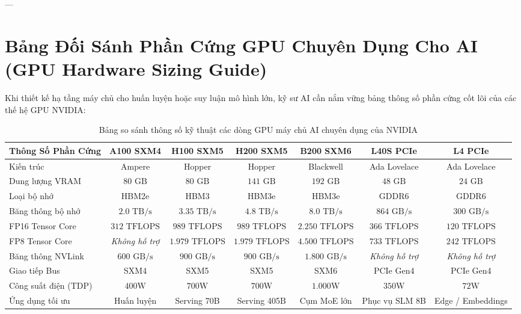 ---

\section{Bảng Đối Sánh Phần Cứng GPU Chuyên Dụng Cho AI (GPU Hardware Sizing Guide)}
\label{sec:app-cheat-gpu-hardware}

Khi thiết kế hạ tầng máy chủ cho huấn luyện hoặc suy luận mô hình lớn, kỹ sư AI cần nắm vững bảng thông số phần cứng cốt lõi của các thế hệ GPU NVIDIA:

\begin{table}[htbp]
\centering
\scriptsize
\caption{Bảng so sánh thông số kỹ thuật các dòng GPU máy chủ AI chuyên dụng của NVIDIA}
\label{tab:app-gpu-specs-comparison}
\begin{tabular}{lcccccc}
\toprule
\textbf{Thông Số Phần Cứng} & \textbf{A100 SXM4} & \textbf{H100 SXM5} & \textbf{H200 SXM5} & \textbf{B200 SXM6} & \textbf{L40S PCIe} & \textbf{L4 PCIe} \\
\midrule
Kiến trúc & Ampere & Hopper & Hopper & Blackwell & Ada Lovelace & Ada Lovelace \\
Dung lượng VRAM & $80\text{ GB}$ & $80\text{ GB}$ & $141\text{ GB}$ & $192\text{ GB}$ & $48\text{ GB}$ & $24\text{ GB}$ \\
Loại bộ nhớ & HBM2e & HBM3 & HBM3e & HBM3e & GDDR6 & GDDR6 \\
Băng thông bộ nhớ & $2.0\text{ TB/s}$ & $3.35\text{ TB/s}$ & $4.8\text{ TB/s}$ & $8.0\text{ TB/s}$ & $864\text{ GB/s}$ & $300\text{ GB/s}$ \\
FP16 Tensor Core & $312\text{ TFLOPS}$ & $989\text{ TFLOPS}$ & $989\text{ TFLOPS}$ & $2.250\text{ TFLOPS}$ & $366\text{ TFLOPS}$ & $120\text{ TFLOPS}$ \\
FP8 Tensor Core & \textit{Không hỗ trợ} & $1.979\text{ TFLOPS}$ & $1.979\text{ TFLOPS}$ & $4.500\text{ TFLOPS}$ & $733\text{ TFLOPS}$ & $242\text{ TFLOPS}$ \\
Băng thông NVLink & $600\text{ GB/s}$ & $900\text{ GB/s}$ & $900\text{ GB/s}$ & $1.800\text{ GB/s}$ & \textit{Không hỗ trợ} & \textit{Không hỗ trợ} \\
Giao tiếp Bus & SXM4 & SXM5 & SXM5 & SXM6 & PCIe Gen4 & PCIe Gen4 \\
Công suất điện (TDP) & $400\text{W}$ & $700\text{W}$ & $700\text{W}$ & $1.000\text{W}$ & $350\text{W}$ & $72\text{W}$ \\
Ứng dụng tối ưu & Huấn luyện & Serving 70B & Serving 405B & Cụm MoE lớn & Phục vụ SLM 8B & Edge / Embeddings \\
\bottomrule
\end{tabular}
\end{table}

